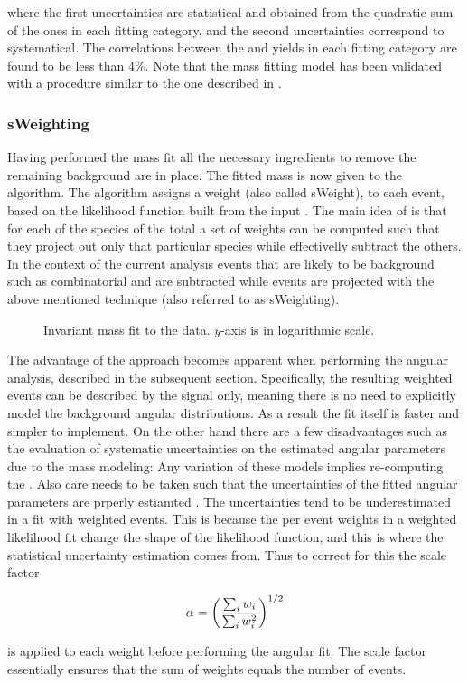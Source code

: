 \noindent where the first uncertainties are statistical and obtained from the quadratic sum of the ones in each fitting category,
and the second uncertainties correspond to systematical. The correlations between the \Bd and \Bs yields in each fitting category
are found to be less than $4\%$. Note that the mass fitting model has been validated with a procedure similar to the
one described in .

\subsubsection{sWeighting}
Having performed the mass fit all the necessary ingredients to remove the remaining background are in place.
The fitted mass \pdf is now given to the \sPlot algorithm. The algorithm assigns a weight (also called sWeight), to each event,
based on the likelihood function built from the input \pdf. The main idea of \sPlot is that for each of the species of the total
\pdf a set of weights can be computed such that they project out only that particular species while effectivelly subtract the others.
In the context of the current analysis events that are likely to be background such as combinatorial and \LbJpsipK are
subtracted while \BJpsiKst events are projected with the above mentioned technique (also referred to as sWeighting).

\begin{figure}[t]
  \centering
  \scalebox{0.5}{}
  \caption{Invariant mass fit to the data. $y$-axis is in logarithmic scale.}
  \label{mass_plot}
\end{figure}

The advantage of the \sWeights approach becomes apparent when performing the angular analysis, described in the subsequent section.
Specifically, the resulting weighted events can be described by the signal \pdf only, meaning there is no need to explicitly model
the background angular distributions. As a result the fit itself is faster and simpler to implement. On the other hand there are a few
disadvantages such as the evaluation of systematic uncertainties on the estimated angular parameters due to the mass \pdf modeling:
Any variation of these models implies re-computing the \sWeights. Also care needs to be taken such that the uncertainties
of the fitted angular parameters are prperly estiamted \cite{splot}. The uncertainties tend to be underestimated in a fit with weighted
events. This is because the per event weights in a weighted likelihood fit change the shape of the likelihood function, and this is
where the statistical uncertainty estimation comes from. Thus to correct for this the scale factor

\begin{equation}
  \centering
  \alpha = \left(\frac{\sum_{i} w_i}{\sum_{i} w_i^2}\right)^{1/2}
  \label{sWeights_scale_factor}
\end{equation}

\noindent is applied to each weight before performing the angular fit. The scale factor essentially ensures that the sum of weights
equals the  number of events.

